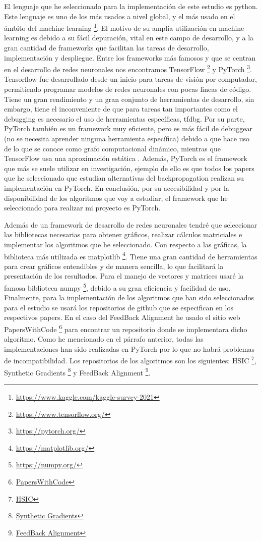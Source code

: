 El lenguaje que he seleccionado para la implementación de este estudio es python. Este lenguaje es uno de los más usados a nivel global, y el más usado en el ámbito del machine learning \footnote{\url{https://www.kaggle.com/kaggle-survey-2021}}. El motivo de su amplia utilización en machine learning es debido a su fácil depuración, vital en este campo de desarrollo, y a la gran cantidad de frameworks que facilitan las tareas de desarrollo, implementación y despliegue. Entre los frameworks más famosos y que se centran en el desarrollo de redes neuronales nos encontramos TensorFlow \footnote{\url{https://www.tensorflow.org/}} y PyTorch \footnote{\url{https://pytorch.org/}}. Tensorflow fue desarrollado desde un inicio para tareas de visión por computador, permitiendo programar modelos de redes neuronales con pocas lineas de código. Tiene un gran rendimiento y un gran conjunto de herramientas de desarrollo, sin embargo, tiene el inconveniente de que para tareas tan importantes como el debugging es necesario el uso de herramientas específicas, tfdbg. Por su parte, PyTorch también es un framework muy eficiente, pero es más fácil de debuggear (no se necesita aprender ninguna herramienta específica) debido a que hace uso de lo que se conoce como grafo computacional dinámico, mientras que TensorFlow usa una aproximación estática \cite{9049650}. Además, PyTorch es el framework que más se suele utilizar en investigación, ejemplo de ello es que todos los papers que he seleccionado que estudian alternativas del backpropagation realizan su implementación en PyTorch.  En conclusión, por su accesibilidad y por la disponibilidad de los algoritmos que voy a estudiar, el framework que he seleccionado para realizar mi proyecto es PyTorch.


Además de un framework de desarrollo de redes neuronales tendré que seleccionar las bibliotecas necesarias para obtener gráficos, realizar cálculos matriciales e implementar los algoritmos que he seleccionado. Con respecto a las gráficas, la biblioteca más utilizada es matplotlib \footnote{\url{https://matplotlib.org/}}. Tiene una gran cantidad de herramientas para crear gráficos entendibles y de manera sencilla, lo que facilitará la presentación de los resultados. Para el manejo de vectores y matrices usaré la famosa biblioteca numpy \footnote{\url{https://numpy.org/}}, debido a su gran eficiencia y facilidad de uso. Finalmente, para la implementación de los algoritmos que han sido seleccionados para el estudio se usará los repositorios de github que se especifican en los respectivos papers. En el caso del FeedBack Alignment he usado el sitio web PapersWithCode \footnote{\href{https://paperswithcode.com/}{PapersWithCode}} para encontrar un repositorio donde se implementara dicho algoritmo. Como he mencionado en el párrafo anterior, todas las implementaciones han sido realizadas en PyTorch por lo que no habrá problemas de incompatibilidad. Los repositorios de los algoritmos son los siguientes: HSIC \footnote{\href{https://github.com/choasma/HSIC-Bottleneck}{HSIC}}, Synthetic Gradients \footnote{\href{https://github.com/koz4k/dni-pytorch}{Synthetic Gradients}} y FeedBack Alignment \footnote{\href{https://github.com/jsalbert/biotorch}{FeedBack Alignment}}.

